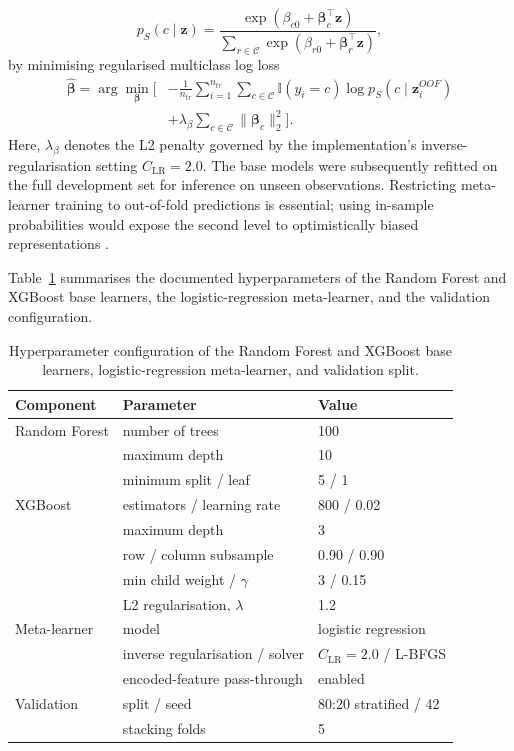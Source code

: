\documentclass[a4paper,fleqn]{cas-dc}
\begin{document}
\begin{equation}
p_{S}(c\mid\mathbf{z})=
\frac{\exp(\beta_{c0}+\boldsymbol{\beta}_c^{\top}\mathbf{z})}
{\sum_{r\in\mathcal{C}}\exp(\beta_{r0}+\boldsymbol{\beta}_r^{\top}\mathbf{z})},
\label{eq:meta}
\end{equation}
by minimising regularised multiclass log loss
\\
\begin{equation}
\begin{aligned}
\widehat{\boldsymbol{\beta}}=\arg\min_{\boldsymbol{\beta}}\Biggl[&
-\frac{1}{n_{tr}}\sum_{i=1}^{n_{tr}}\sum_{c\in\mathcal{C}}
\mathbb{I}(y_i=c)\log p_S(c\mid\mathbf{z}^{OOF}_i)\\
&+\lambda_{\beta}\sum_{c\in\mathcal{C}}\lVert\boldsymbol{\beta}_c\rVert_2^2\Biggr].
\end{aligned}
\label{eq:metaloss}
\end{equation}
Here, $\lambda_{\beta}$ denotes the L2 penalty governed by the implementation's inverse-regularisation setting $C_{\mathrm{LR}}=2.0$. The base models were subsequently refitted on the full development set for inference on unseen observations. Restricting meta-learner training to out-of-fold predictions is essential; using in-sample probabilities would expose the second level to optimistically biased representations \cite{kapoor2023,alabi2023}.

Table~\ref{tab:hyper} summarises the documented hyperparameters of the Random Forest and XGBoost base learners, the logistic-regression meta-learner, and the validation configuration.

\begin{table}[width=\textwidth,pos=!tbp]
\centering
\caption{Hyperparameter configuration of the Random Forest and XGBoost base learners, logistic-regression meta-learner, and validation split.}
\label{tab:hyper}
\small
\begin{tabular}{lll}
\toprule
Component & Parameter & Value \\
\midrule
Random Forest & number of trees & 100 \\
 & maximum depth & 10 \\
 & minimum split / leaf & 5 / 1 \\
XGBoost & estimators / learning rate & 800 / 0.02 \\
 & maximum depth & 3 \\
 & row / column subsample & 0.90 / 0.90 \\
 & min child weight / $\gamma$ & 3 / 0.15 \\
 & L2 regularisation, $\lambda$ & 1.2 \\
Meta-learner & model & logistic regression \\
 & inverse regularisation / solver & $C_{\mathrm{LR}}=2.0$ / L-BFGS \\
 & encoded-feature pass-through & enabled \\
Validation & split / seed & 80:20 stratified / 42 \\
 & stacking folds & 5 \\
\bottomrule
\end{tabular}
\end{table}
\end{document}
